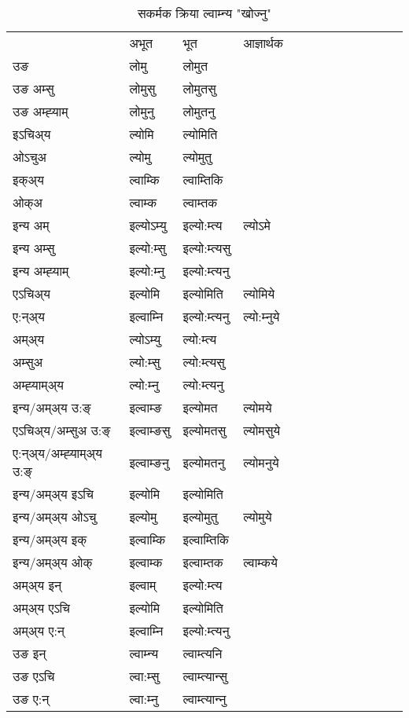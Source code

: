 \begin{table}[H]
\label{om.vt} \centering
\caption{सकर्मक क्रिया  ल्वाम्‍न्य  "खोज्नु"  }
\begin{tabular}{l|l|l|l|l|l|l|l|l|l|l|l|l}  \toprule
&अभूत & भूत & आज्ञार्थक \\ 
उङ &लोमु &लोमुत \\ 
उङ अम्सु &लोमुसु &लोमुतसु \\ 
उङ अम्ह्‍याम् &लोमुनु &लोमुतनु \\ 
इऽचिअ्य &ल्योमि &ल्योमिति   \\ 
ओऽचुअ &ल्योमु &ल्योमुतु   \\ 
इक्अ्य &ल्वाम्कि &ल्वाम्तिकि   \\ 
ओक्अ &ल्वाम्क &ल्वाम्तक   \\ 
इन्य अम् & इल्योऽम्यु  & इल्यो:म्त्य &ल्योऽमे  \\ 
इन्य अम्सु & इल्यो:म्सु  & इल्यो:म्त्यसु   \\ 
इन्य अम्ह्‍याम् & इल्यो:म्‍नु  & इल्यो:म्त्यनु   \\ 
एऽचिअ्य & इल्योमि & इल्योमिति &ल्योमिये    \\ 
ए:न्अ्य & इल्वाम्‍नि  & इल्यो:म्त्यनु &ल्यो:म्‍नुये  \\ 
अम्अ्य & ल्योऽम्यु  & ल्यो:म्त्य  \\ 
अम्सुअ & ल्यो:म्सु & ल्यो:म्त्यसु  \\ 
अम्ह्‍याम्अ्य & ल्यो:म्‍नु  & ल्यो:म्त्यनु \\ 
\midrule
इन्य/अम्अ्य उ:ङ्‌&इल्वाम्ङ & इल्योमत &ल्योमये \\ 
एऽचिअ्य/अम्सुअ उ:ङ्‌ &इल्वाम्ङसु & इल्योमतसु &ल्योमसुये \\ 
ए:न्अ्य/अम्ह्‍याम्अ्य उ:ङ्‌ &इल्वाम्ङनु & इल्योमतनु &ल्योमनुये \\ 
इन्य/अम्अ्य इऽचि & इल्योमि & इल्योमिति    \\ 
इन्य/अम्अ्य ओऽचु & इल्योमु & इल्योमुतु  &ल्योमुये  \\ 
इन्य/अम्अ्य इक् & इल्वाम्कि & इल्वाम्तिकि   \\ 
इन्य/अम्अ्य ओक् & इल्वाम्क & इल्वाम्तक  &ल्वाम्कये  \\ 
अम्अ्य इन् & इल्वाम् & इल्यो:म्त्य   \\ 
अम्अ्य एऽचि & इल्योमि & इल्योमिति    \\ 
अम्अ्य ए:न् & इल्वाम्‍नि  & इल्यो:म्त्यनु  \\ 
\midrule
उङ इन् & ल्वाम्‍न्य  & ल्वाम्त्यनि  \\ 
उङ एऽचि & ल्वा:म्सु  & ल्वाम्त्यान्सु   \\ 
उङ ए:न्& ल्वा:म्‍नु  & ल्वाम्त्यान्‍नु   \\ 
\bottomrule
\end{tabular}
\end{table}


